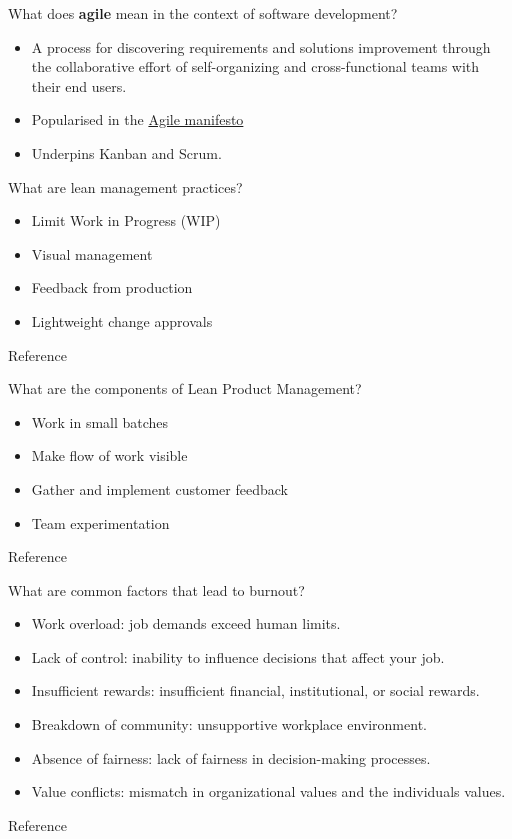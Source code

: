 \begin{questions}
\question What does \textbf{agile} mean in the context of software development?
\begin{solution}
\begin{itemize}
    \item A process for discovering requirements and solutions improvement through the collaborative effort of self-organizing and cross-functional teams with their end users.
    \item Popularised in the \href{http://agilemanifesto.org/}{Agile manifesto}
    \item Underpins Kanban and Scrum.
\end{itemize}
\end{solution}

\question[4] What are lean management practices?
\begin{solution}
\begin{itemize}
    \item Limit Work in Progress (WIP)
    \item Visual management
    \item Feedback from production
    \item Lightweight change approvals
\end{itemize}
Reference \cite[p.~76]{accel}
\end{solution}

\question[4] What are the components of Lean Product Management?
\begin{solution}
\begin{itemize}
    \item Work in small batches
    \item Make flow of work visible
    \item Gather and implement customer feedback
    \item Team experimentation
\end{itemize}
Reference \cite[p.~85]{accel}
\end{solution}

\question[6] What are common factors that lead to burnout?
\begin{solution}
\begin{itemize}
    \item Work overload: job demands exceed human limits.
    \item Lack of control: inability to influence decisions that affect your job.
    \item Insufficient rewards: insufficient financial, institutional, or social rewards.
    \item Breakdown of community: unsupportive workplace environment.
    \item Absence of fairness: lack of fairness in decision-making processes.
    \item Value conflicts: mismatch in organizational values and the individuals values.
\end{itemize}
Reference \cite[p.~96]{accel}
\end{solution}


\end{questions}
